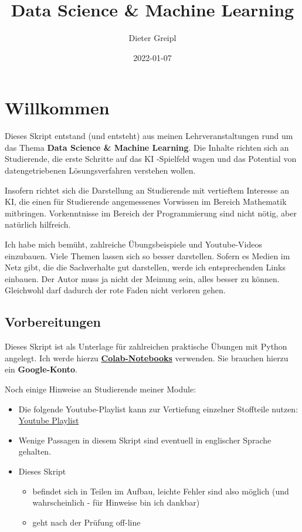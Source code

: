 \documentclass[
]{book}
\title{Data Science \& Machine Learning}
\author{Dieter Greipl}
\date{2022-01-07}
\providecommand{\tightlist}{%
  \setlength{\itemsep}{0pt}\setlength{\parskip}{0pt}}
\theoremstyle{definition}
\theoremstyle{definition}
\theoremstyle{definition}
\theoremstyle{definition}
\theoremstyle{remark}
\begin{document}
\maketitle

{
\setcounter{tocdepth}{1}
\tableofcontents
}
\hypertarget{willkommen}{%
\chapter*{Willkommen}\label{willkommen}}

Dieses Skript entstand (und entsteht) aus meinen Lehrveranstaltungen rund um das Thema \textbf{Data Science \& Machine Learning}. Die Inhalte richten sich an Studierende, die erste Schritte auf das KI -Spielfeld wagen und das Potential von datengetriebenen Lösungsverfahren verstehen wollen.

Insofern richtet sich die Darstellung an Studierende mit vertieftem Interesse an KI, die einen für Studierende angemessenes Vorwissen im Bereich Mathematik mitbringen. Vorkenntnisse im Bereich der Programmierung sind nicht nötig, aber natürlich hilfreich.

Ich habe mich bemüht, zahlreiche Übungsbeispiele und Youtube-Videos einzubauen. Viele Themen lassen sich so besser darstellen. Sofern es Medien im Netz gibt, die die Sachverhalte gut darstellen, werde ich entsprechenden Links einbauen. Der Autor muss ja nicht der Meinung sein, alles besser zu können. Gleichwohl darf dadurch der rote Faden nicht verloren gehen.

\hypertarget{vorbereitungen}{%
\section{Vorbereitungen}\label{vorbereitungen}}

Dieses Skript ist als Unterlage für zahlreichen praktische Übungen mit Python angelegt. Ich werde hierzu \href{https://colab.research.google.com/}{\textbf{Colab-Notebooks}} verwenden. Sie brauchen hierzu ein \textbf{Google-Konto}.

Noch einige Hinweise an Studierende meiner Module:

\begin{itemize}
\tightlist
\item
  Die folgende Youtube-Playlist kann zur Vertiefung einzelner Stoffteile nutzen: \href{https://youtube.com/playlist?list=PLfGN40VwjduJPvtP9QUjC0rjM6-ePT9bg}{Youtube Playlist}
\item
  Wenige Passagen in diesem Skript sind eventuell in englischer Sprache gehalten.
\item
  Dieses Skript

  \begin{itemize}
  \tightlist
  \item
    befindet sich in Teilen im Aufbau, leichte Fehler sind also möglich (und wahrscheinlich - für Hinweise bin ich dankbar)
  \item
    geht nach der Prüfung off-line
  \end{itemize}
\end{itemize}
\end{document}
